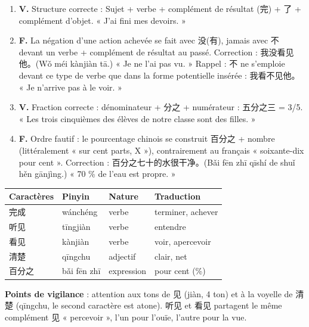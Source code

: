 \documentclass[11pt]{article}
\begin{document}
\begin{corrige}
\begin{enumerate}
\item \textbf{V.} Structure correcte : Sujet + verbe + complément de résultat (完) + 了 + complément d'objet. « J'ai fini mes devoirs. »
\item \textbf{F.} La négation d'une action achevée se fait avec 没(有), jamais avec 不 devant un verbe + complément de résultat au passé. Correction : 我没看见他。(Wǒ méi kànjiàn tā.) « Je ne l'ai pas vu. » Rappel : 不 ne s'emploie devant ce type de verbe que dans la forme potentielle insérée : 我看不见他。 « Je n'arrive pas à le voir. »
\item \textbf{V.} Fraction correcte : dénominateur + 分之 + numérateur : 五分之三 = 3/5. « Les trois cinquièmes des élèves de notre classe sont des filles. »
\item \textbf{F.} Ordre fautif : le pourcentage chinois se construit 百分之 + nombre (littéralement « sur cent parts, X »), contrairement au français « soixante-dix pour cent ». Correction : 百分之七十的水很干净。(Bǎi fēn zhī qīshí de shuǐ hěn gānjìng.) « 70 \% de l'eau est propre. »
\end{enumerate}
\end{corrige}

\begin{corrige}
\begin{center}
\begin{tabularx}{\linewidth}{|X|X|X|X|}\hline
\rowcolor{popblueL} Caractères & Pinyin & Nature & Traduction \\ \hline
完成 & wánchéng & verbe & terminer, achever \\ \hline
听见 & tīngjiàn & verbe & entendre \\ \hline
看见 & kànjiàn & verbe & voir, apercevoir \\ \hline
清楚 & qīngchu & adjectif & clair, net \\ \hline
百分之 & bǎi fēn zhī & expression & pour cent (\%) \\ \hline
\end{tabularx}
\end{center}
\textbf{Points de vigilance} : attention aux tons de 见 (jiàn, 4 ton) et à la voyelle de 清楚 (qīngchu, le second caractère est atone). 听见 et 看见 partagent le même complément 见 « percevoir », l'un pour l'ouïe, l'autre pour la vue.
\end{corrige}
\end{document}
